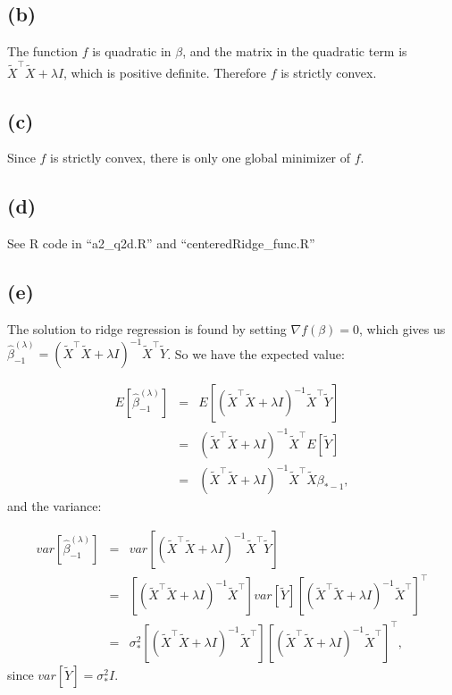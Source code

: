 \documentclass{article}\usepackage[]{graphicx}\usepackage[]{color}
\begin{document}
\subsection*{(b)}
The function $f$ is quadratic in $\beta$, and the matrix in the quadratic term is $\tilde{X}^\top\tilde{X}+\lambda I$, which is positive definite.  Therefore $f$ is strictly convex.

\subsection*{(c)}
Since $f$ is strictly convex, there is only one global minimizer of $f$.

\subsection*{(d)}
See R code in ``a2\_q2d.R'' and ``centeredRidge\_func.R''

\subsection*{(e)}
The solution to ridge regression is found by setting $\nabla f(\beta)=0$, which gives us $\hat{\beta}^{(\lambda)}_{-1}=(\tilde{X}^\top\tilde{X}+\lambda I)^{-1}\tilde{X}^\top\tilde{Y}$.  So we have the expected value:

\begin{eqnarray*}
  E[\hat{\beta}^{(\lambda)}_{-1}] &=& E[(\tilde{X}^\top\tilde{X}+\lambda I)^{-1}\tilde{X}^\top\tilde{Y}] \\
            &=& (\tilde{X}^\top\tilde{X}+\lambda I)^{-1}\tilde{X}^\top E[\tilde{Y}] \\
            &=&  (\tilde{X}^\top\tilde{X}+\lambda I)^{-1}\tilde{X}^\top\tilde{X}\beta_{*-1},
\end{eqnarray*}
and the variance:

\begin{eqnarray*}
  var[\hat{\beta}^{(\lambda)}_{-1}] &=& var[(\tilde{X}^\top\tilde{X}+\lambda I)^{-1}\tilde{X}^\top\tilde{Y}] \\
            &=& [(\tilde{X}^\top\tilde{X}+\lambda I)^{-1}\tilde{X}^\top] var[\tilde{Y}] [(\tilde{X}^\top\tilde{X}+\lambda I)^{-1}\tilde{X}^\top]^\top \\
            &=& \sigma^2_* [(\tilde{X}^\top\tilde{X}+\lambda I)^{-1}\tilde{X}^\top ] [(\tilde{X}^\top\tilde{X}+\lambda I)^{-1}\tilde{X}^\top]^\top,
\end{eqnarray*}
since $var[\tilde{Y}]=\sigma^2_* I$.
\end{document}
